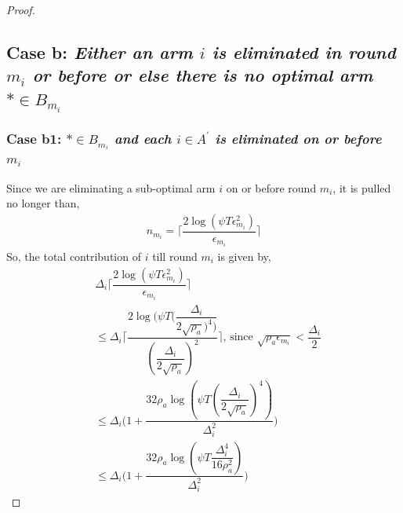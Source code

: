 \begin{proof}

% 



\subsection*{Case b: \textit{Either an arm ${i}$ is eliminated in round $m_{i}$ or before or else there is no optimal arm ${*}\in B_{m_{i}}$ }}

\subsubsection*{Case b1: \textit{${*}\in B_{m_{i}}$ and each ${i}\in A^{'}$ is  eliminated on or before $m_{i}$ } }

 Since we are eliminating a sub-optimal arm ${i}$ on or before round $m_{i}$, it is pulled no longer than, 
 \begin{align*}
 n_{m_{i}}=\bigg\lceil\dfrac{2\log{(\psi T\epsilon_{m_{i}}^{2})}}{\epsilon_{m_{i}}}\bigg\rceil
 \end{align*}
So, the total contribution of ${i}$  till round $m_{i}$ is given by, 
\begin{align*}
&\Delta_{i}\bigg\lceil\dfrac{2\log{(\psi T\epsilon_{m_{i}}^{2})}}{\epsilon_{m_{i}}}\bigg\rceil\\
&\leq\Delta_{i}\bigg\lceil\dfrac{2\log{(\psi T(\dfrac{\Delta_{i}}{2\sqrt{\rho_{a}})^{4})}}}{(\dfrac{\Delta_{i}}{2\sqrt{\rho_{a}}})^{2}}\bigg\rceil \text{, since } \sqrt{\rho_{a}\epsilon_{m_{i}}} < \dfrac{\Delta_{i}}{2}\\
&\leq\Delta_{i}\bigg(1+\dfrac{32\rho_{a}\log{(\psi T(\dfrac{\Delta_{i}}{2\sqrt{\rho_{a}}})^{4})}}{\Delta_{i}^{2}}\bigg)
\\
&\leq\Delta_{i}\bigg(1+\dfrac{32\rho_{a}\log{(\psi T\dfrac{\Delta_{i}^{4}}{16\rho_{a}^{2}})}}{\Delta_{i}^{2}}\bigg)
\end{align*} 
 

\end{proof}
